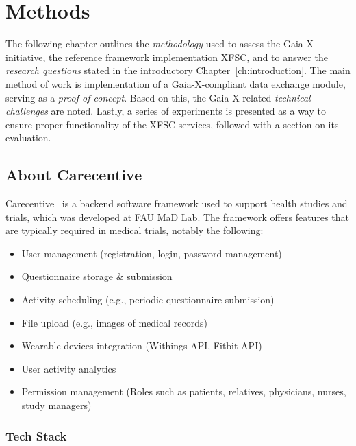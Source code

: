 \chapter{Methods}\label{ch:methods}

\begin{chapterabstract}
    The following chapter outlines the \textit{methodology} used to assess the Gaia-X initiative, the reference framework implementation XFSC, and to answer the \textit{research questions} stated in the introductory Chapter~\ref{ch:introduction}.
    The main method of work is implementation of a Gaia-X-compliant data exchange module, serving as a \textit{proof of concept}.
    Based on this, the Gaia-X-related \textit{technical challenges} are noted.
    Lastly, a series of experiments is presented as a way to ensure proper functionality of the XFSC services, followed with a section on its evaluation.
\end{chapterabstract}

\section{About Carecentive}\label{sec:about-carecentive}

Carecentive~\cite{carecentive} is a backend software framework used to support health studies and trials, which was developed at FAU MaD Lab.
The framework offers features that are typically required in medical trials, notably the following:
\begin{itemize}
    \item User management (registration, login, password management)
    \item Questionnaire storage \& submission
    \item Activity scheduling (e.g., periodic questionnaire submission)
    \item File upload (e.g., images of medical records)
    \item Wearable devices integration (Withings API, Fitbit API)
    \item User activity analytics
    \item Permission management (Roles such as patients, relatives, physicians, nurses, study managers)
\end{itemize}

\subsection{Tech Stack}\label{subsec:tech-stack}

